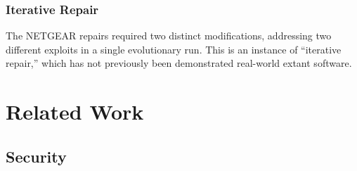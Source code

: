 \documentclass{sigcomm-alternate}
\begin{document}
\subsubsection{Iterative Repair}
\label{iterative-repair}
The NETGEAR  repairs required two distinct modifications, addressing two different
exploits in a single evolutionary run.  This is an instance of
``iterative repair,'' which has not previously been demonstrated 
real-world extant software.
%


\section{Related Work}
\label{sec-5}
\subsection{Security}
\label{sec-5-1}

\end{document}
